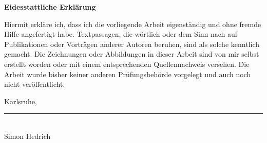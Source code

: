 \cleardoublepage
\begin{minipage}[0.49\textheight]{0.95\textwidth}
    \normalsize
    \textbf{Eidesstattliche Erklärung}\par
    \vspace{\baselineskip}
    \small
    Hiermit erkläre ich, dass ich die vorliegende Arbeit eigenständig und ohne fremde Hilfe angefertigt habe. Textpassagen, die wörtlich oder dem Sinn nach auf Publikationen oder Vorträgen anderer Autoren beruhen, sind als solche kenntlich gemacht. Die Zeichnungen oder Abbildungen in dieser Arbeit sind von mir selbst erstellt worden oder mit einem entsprechenden Quellennachweis versehen. Die Arbeit wurde bisher keiner anderen Prüfungsbehörde vorgelegt und auch noch nicht veröffentlicht.

    \vspace{1cm}


    \noindent Karlsruhe, %

    \vspace{0.75cm}


    \raggedleft\rule{5cm}{0.4pt} \\
    \raggedleft Simon Hedrich \hspace{1cm}

\end{minipage}
